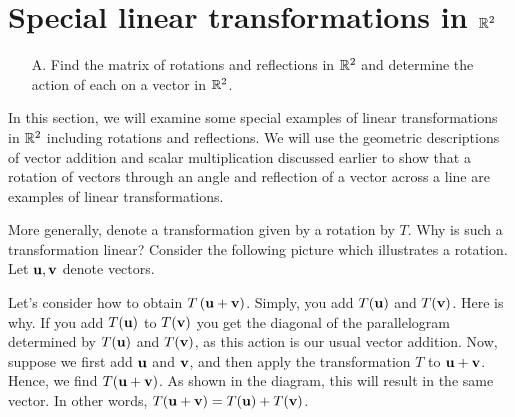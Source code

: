 \section{Special linear transformations in $\mathbb{R}^2$}

\begin{outcome}
\begin{enumerate}
\item[A.] Find the matrix of rotations and reflections in $\mathbb{R}^2$ and determine the action of each on a vector in $\mathbb{R}^2$. 
\end{enumerate}
\end{outcome}

In this section, we will examine some special examples of linear transformations in $\mathbb{R}^2$ including rotations and reflections. We will use the geometric descriptions of vector addition and scalar
multiplication discussed earlier to show that a rotation of vectors through an angle and reflection of a vector across a line are examples of
linear transformations. 

More generally, denote a transformation given by a rotation by $T$. Why is such a transformation
linear? Consider the following picture which illustrates a rotation. Let $\mbox{\bf u},\mbox{\bf v}$ denote vectors. 

\begin{center}
\end{center}

Let's consider how to obtain $T\left(\mbox{\bf u}+\mbox{\bf v}\right)$. 
Simply, you add $T (\mbox{\bf u})$ and $T(\mbox{\bf v})$. 
Here is why. If you add $T(\mbox{\bf u})$ to $T(\mbox{\bf v})$ you get
the diagonal of the parallelogram determined by $T(\mbox{\bf u})$ and $T(\mbox{\bf v})$, as this action
is our usual vector addition.
Now, suppose we first add $\mbox{\bf u}$ and $\mbox{\bf v}$, and then apply the transformation $T$ to 
$\mbox{\bf u}+\mbox{\bf v}$. Hence, we find $T( \mbox{\bf u}+\mbox{\bf v})$. 
As shown in the diagram, this will result in the same vector. In other words, $T(\mbox{\bf u}+\mbox{\bf v}) = T(\mbox{\bf u}) 
+ T(\mbox{\bf v})$. 

